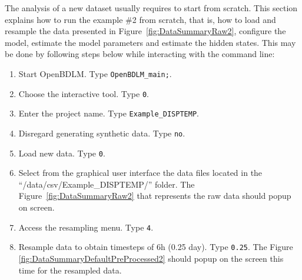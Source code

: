 The analysis of a new dataset usually requires to start from scratch.
This section explains how to run the example \#2 from scratch, that is, how to load  and resample the data presented in Figure~\ref{fig:DataSummaryRaw2}, configure the model, estimate the model parameters and estimate the hidden states.
This may be done by following steps below while interacting with the \MATLAB{} command line:
\begin{enumerate}
\item Start OpenBDLM. Type \colorbox{light-gray}{\lstinline[basicstyle = \mlttfamily \small, backgroundcolor = \color{light-gray}]!OpenBDLM_main;!}.
\item Choose the interactive tool. Type \colorbox{light-gray}{\lstinline[basicstyle = \mlttfamily \small, backgroundcolor = \color{light-gray}]!0!}.
\item Enter the project name. Type \colorbox{light-gray}{\lstinline[basicstyle = \mlttfamily \small, backgroundcolor = \color{light-gray}]!Example_DISPTEMP!}. 
\item Disregard generating synthetic data. Type \colorbox{light-gray}{\lstinline[basicstyle = \mlttfamily \small, backgroundcolor = \color{light-gray}]!no!}. 
\item Load new data. Type \colorbox{light-gray}{\lstinline[basicstyle = \mlttfamily \small, backgroundcolor = \color{light-gray}]!0!}.
\item Select from the graphical user interface the data files located in the ``/data/csv/Example\_DISPTEMP/'' folder. The Figure~\ref{fig:DataSummaryRaw2} that represents the raw data should popup on screen.
\item Access the resampling menu. Type \colorbox{light-gray}{\lstinline[basicstyle = \mlttfamily \small, backgroundcolor = \color{light-gray}]!4!}. 

\item Resample data to obtain timesteps of 6h (0.25 day). Type \colorbox{light-gray}{\lstinline[basicstyle = \mlttfamily \small, backgroundcolor = \color{light-gray}]!0.25!}. The Figure \ref{fig:DataSummaryDefaultPreProcessed2} should popup on the screen this time for the resampled data.


\end{enumerate}
